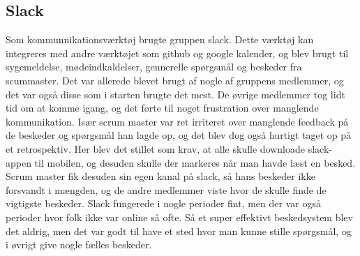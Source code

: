 \subsection{Slack}
Som kommunnikationsværktøj brugte gruppen slack. Dette værktøj kan integreres med andre værktøjet som github og google kalender, og blev brugt til 
sygemeldelse, mødeindkaldelser, gennerelle spørgsmål og beskeder fra scummaster. Det var allerede blevet brugt af nogle af gruppens medlemmer, og det var 
også disse som i starten brugte det mest. De øvrige medlemmer tog lidt tid om at komme igang, og det førte til noget frustration over manglende kommunikation.
Især scrum master var ret irriteret over manglende feedback på de beskeder og spørgsmål han lagde op, og det blev dog også hurtigt taget op på et retrospektiv.
Her blev det stillet som krav, at alle skulle downloade slack-appen til mobilen, og desuden skulle der markeres når man havde læst en besked. 
Scrum master fik desuden sin egen kanal på slack, så hans beskeder ikke forsvandt i mængden, og de andre medlemmer viste hvor de skulle finde de vigtigste 
beskeder. Slack fungerede i nogle perioder fint, men der var også perioder hvor folk ikke var online så ofte. Så et super effektivt beskedsystem blev det aldrig, 
men det var godt til have et sted hvor man kunne stille spørgsmål, og i øvrigt give nogle fælles beskeder.  
      
